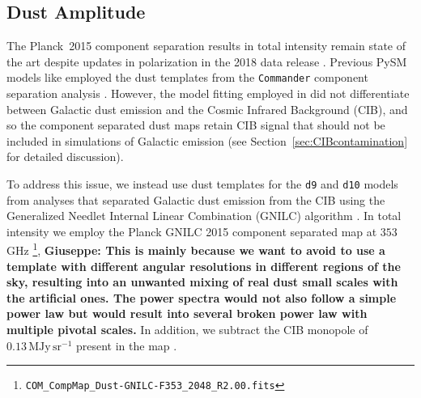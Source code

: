\subsection{Dust Amplitude}\label{sec:dustamplitude}
The Planck~2015 component separation results in total intensity remain state of the art despite updates in polarization in the 2018 data release \citep{planck2016-l04}. Previous PySM models like  employed the dust templates from the \texttt{Commander} component separation analysis \citep{planck2014-a11}. However, the model fitting employed in \citet{planck2014-a11} did not differentiate between Galactic dust emission and the Cosmic Infrared Background (CIB), and so the component separated dust maps retain CIB signal that should not be included in simulations of Galactic emission (see Section~\ref{sec:CIBcontamination} for detailed discussion).

To address this issue, we instead use dust templates for the {\tt d9} and {\tt d10} models from analyses that separated Galactic dust emission from the CIB using the Generalized Needlet Internal Linear Combination (GNILC) algorithm \citep{2011MNRAS.418..467R}. In total intensity we employ the Planck GNILC 2015 component separated map at $353$\,GHz \citep{planck2016-XLVIII}\footnote{\texttt{COM\_CompMap\_Dust-GNILC-F353\_2048\_R2.00.fits}}, 
 \textbf{Giuseppe: This is mainly because we want to avoid to use  a  template with different angular resolutions in different regions of the sky, resulting into an unwanted mixing of real dust small scales with the  artificial ones.  The power spectra would not also follow a simple power law but would result into several broken power law with multiple pivotal scales. }
In addition, we subtract the CIB monopole of $0.13\, \text{MJy}\,\text{sr}^{-1}$ present in the map \citep[][Section~2.2]{planck2016-l04}.

